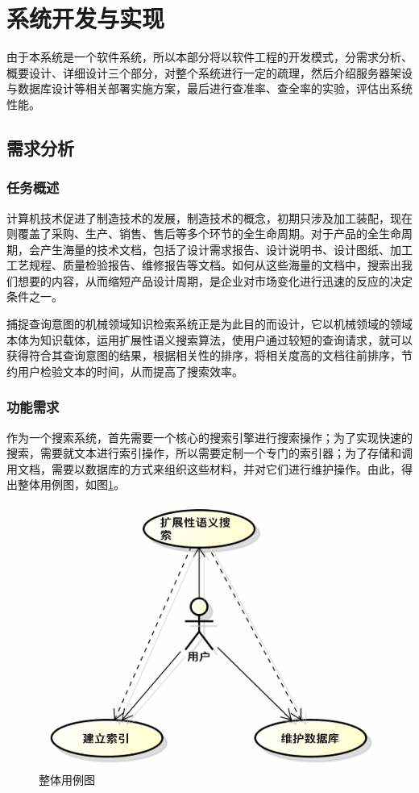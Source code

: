 \documentclass[12pt,a4paper]{article}
\newcommand{\wuhao}{\fontsize{10.5pt}{\baselineskip}\selectfont}
\begin{document}
\newpage
\section{系统开发与实现}
\setcounter{figure}{0}
\setcounter{table}{0}
\setcounter{equation}{0}
	由于本系统是一个软件系统，所以本部分将以软件工程的开发模式，分需求分析、概要设计、详细设计三个部分，对整个系统进行一定的疏理，然后介绍服务器架设与数据库设计等相关部署实施方案，最后进行查准率、查全率的实验，评估出系统性能。
	\subsection{需求分析}
		\subsubsection{任务概述}
	计算机技术促进了制造技术的发展，制造技术的概念，初期只涉及加工装配，现在则覆盖了采购、生产、销售、售后等多个环节的全生命周期。对于产品的全生命周期，会产生海量的技术文档，包括了设计需求报告、设计说明书、设计图纸、加工工艺规程、质量检验报告、维修报告等文档。如何从这些海量的文档中，搜索出我们想要的内容，从而缩短产品设计周期，是企业对市场变化进行迅速的反应的决定条件之一。
	
	捕捉查询意图的机械领域知识检索系统正是为此目的而设计，它以机械领域的领域本体为知识载体，运用扩展性语义搜索算法，使用户通过较短的查询请求，就可以获得符合其查询意图的结果，根据相关性的排序，将相关度高的文档往前排序，节约用户检验文本的时间，从而提高了搜索效率。
   
		\subsubsection{功能需求}
	作为一个搜索系统，首先需要一个核心的搜索引擎进行搜索操作；为了实现快速的搜索，需要就文本进行索引操作，所以需要定制一个专门的索引器；为了存储和调用文档，需要以数据库的方式来组织这些材料，并对它们进行维护操作。由此，得出整体用例图，如图\ref{fig:整体用例图}。
	
	\begin{figure}[htbp] 
	\centering\includegraphics[scale=0.5]{fig/SystemUseCase.png} 
	\caption{\wuhao 整体用例图}\label{fig:整体用例图} 
	\end{figure} 
	
\end{document}
